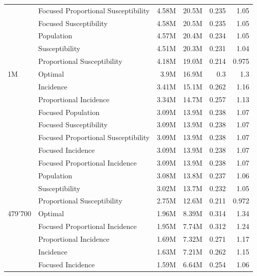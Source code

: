 \begin{table}[h!]
\begin{tabular}{llrrrr}
        & Focused Proportional Susceptibility &   4.58M &    20.5M &          0.235 &        1.05 \\
        & Focused Susceptibility &   4.58M &    20.5M &          0.235 &        1.05 \\
        & Population &   4.57M &    20.4M &          0.234 &        1.05 \\
        & Susceptibility &   4.51M &    20.3M &          0.231 &        1.04 \\
        & Proportional Susceptibility &   4.18M &     19.0M &          0.214 &       0.975 \\
1M & Optimal &    3.9M &    16.9M &            0.3 &         1.3 \\
        & Incidence &   3.41M &    15.1M &          0.262 &        1.16 \\
        & Proportional Incidence &   3.34M &    14.7M &          0.257 &        1.13 \\
        & Focused Population &   3.09M &    13.9M &          0.238 &        1.07 \\
        & Focused Susceptibility &   3.09M &    13.9M &          0.238 &        1.07 \\
        & Focused Proportional Susceptibility &   3.09M &    13.9M &          0.238 &        1.07 \\
        & Focused Incidence &   3.09M &    13.9M &          0.238 &        1.07 \\
        & Focused Proportional Incidence &   3.09M &    13.9M &          0.238 &        1.07 \\
        & Population &   3.08M &    13.8M &          0.237 &        1.06 \\
        & Susceptibility &   3.02M &    13.7M &          0.232 &        1.05 \\
        & Proportional Susceptibility &   2.75M &    12.6M &          0.211 &       0.972 \\
479'700 & Optimal &   1.96M &    8.39M &          0.314 &        1.34 \\
        & Focused Proportional Incidence &   1.95M &    7.74M &          0.312 &        1.24 \\
        & Proportional Incidence &   1.69M &    7.32M &          0.271 &        1.17 \\
        & Incidence &   1.63M &    7.21M &          0.262 &        1.15 \\
        & Focused Incidence &   1.59M &    6.64M &          0.254 &        1.06 \\

\end{tabular}
\end{table}
